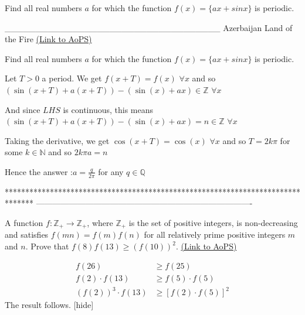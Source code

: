 \begin{problem}
	Find all real numbers $a$ for which the function $f(x)=\{ ax+sinx\}$ is periodic.


___________________________________
Azerbaijan Land of the Fire 
	\flushright \href{https://artofproblemsolving.com/community/c6h530753}{(Link to AoPS)}
\end{problem}



\begin{solution}
	\begin{tcolorbox}Find all real numbers $a$ for which the function $f(x)=\{ ax+sinx\}$ is periodic.\end{tcolorbox}
Let $T>0$ a period. We get $f(x+T)=f(x)$ $\forall x$ and so $(\sin(x+T)+a(x+T))-(\sin(x)+ax)\in\mathbb Z$ $\forall x$

And since $LHS$ is continuous, this means $(\sin(x+T)+a(x+T))-(\sin(x)+ax)=n\in\mathbb Z$ $\forall x$

Taking the derivative, we get $\cos(x+T)=\cos(x)$ $\forall x$ and so $T=2k\pi$ for some $k\in\mathbb N$ and so $2k\pi a=n$

Hence the answer :$\boxed{a=\frac{q}{2\pi}}$ for any ${q\in\mathbb Q}$
\end{solution}
*******************************************************************************
-------------------------------------------------------------------------------

\begin{problem}
	A function $f : \mathbb{Z}_+ \to \mathbb{Z}_+$, where $\mathbb{Z}_+$ is the set of positive integers, is non-decreasing and satisfies $f(mn) = f(m)f(n)$ for all relatively prime positive integers $m$ and $n$. Prove that $f(8)f(13) \ge (f(10))^2$.
	\flushright \href{https://artofproblemsolving.com/community/c6h530761}{(Link to AoPS)}
\end{problem}



\begin{solution}
\begin{align*}f(26) &\geq f(25)\\ f(2) \cdot f(13) &\geq f(5) \cdot f(5)\\ \left(f(2)\right)^3 \cdot f(13) &\geq [f(2) \cdot f(5)]^2 \end{align*}
The result follows.
[\/hide]
\end{solution}



